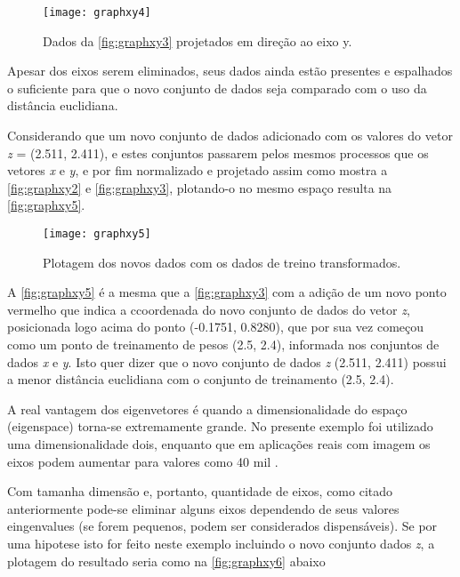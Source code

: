 \begin{figure}[h]
	\centering
	\texttt{[image: graphxy4]}
	\caption{Dados da \autoref{fig:graphxy3} projetados em direção ao eixo y.}
	\label{fig:graphxy4}
\end{figure}


Apesar dos eixos serem eliminados, seus dados ainda estão presentes e espalhados o suficiente para que o novo conjunto de dados seja comparado com o uso da distância euclidiana.

Considerando que um novo conjunto de dados adicionado com os valores do vetor \textit{z} = (2.511, 2.411), e estes conjuntos passarem pelos mesmos processos que os vetores \textit{x} e \textit{y}, e por fim normalizado e projetado assim como mostra a \autoref{fig:graphxy2} e \autoref{fig:graphxy3}, plotando-o no mesmo espaço resulta na \autoref{fig:graphxy5}.

\begin{figure}[h]
	\centering
	\texttt{[image: graphxy5]}
	\caption{Plotagem dos novos dados com os dados de treino transformados.}
	\label{fig:graphxy5}
\end{figure}

A \autoref{fig:graphxy5} é a mesma que a \autoref{fig:graphxy3} com a adição de um novo ponto vermelho que indica a ccoordenada do novo conjunto de dados do vetor \textit{z}, posicionada logo acima do ponto (-0.1751, 0.8280), que por sua vez começou como um ponto de treinamento de pesos (2.5, 2.4), informada nos conjuntos de dados \textit{x} e \textit{y}. Isto quer dizer que o novo conjunto de dados \textit{z} (2.511, 2.411) possui a menor distância euclidiana com o conjunto de treinamento (2.5, 2.4). 

A real vantagem dos eigenvetores é quando a dimensionalidade do espaço (eigenspace) torna-se extremamente grande. No presente exemplo foi utilizado uma dimensionalidade dois, enquanto que em aplicações reais com imagem os eixos podem aumentar para valores como 40 mil \cite{drmathew_java_programming}.

Com tamanha dimensão e, portanto, quantidade de eixos, como citado anteriormente pode-se eliminar alguns eixos dependendo de seus valores eingenvalues (se forem pequenos, podem ser considerados dispensáveis). Se por uma hipotese isto for feito neste exemplo incluindo o novo conjunto dados \textit{z}, a plotagem do resultado seria como na \autoref{fig:graphxy6} abaixo

